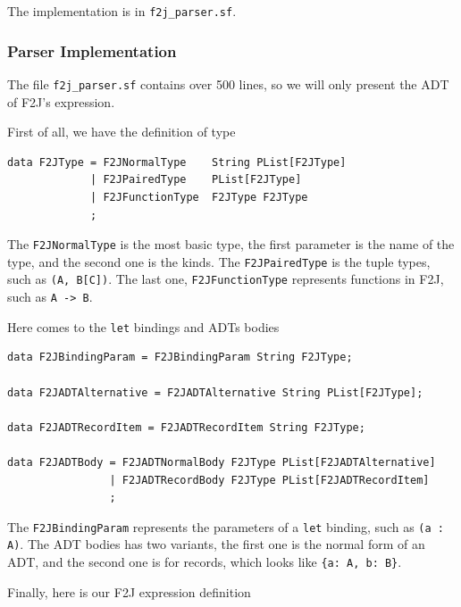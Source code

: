 The implementation is in \texttt{f2j\_parser.sf}.

\subsubsection{Parser Implementation}

The file \texttt{f2j\_parser.sf} contains over 500 lines, so we will only present the ADT of F2J's expression.

First of all, we have the definition of type

\begin{lstlisting}
data F2JType = F2JNormalType    String PList[F2JType]
             | F2JPairedType    PList[F2JType]
             | F2JFunctionType  F2JType F2JType
             ;
\end{lstlisting}

The \texttt{F2JNormalType} is the most basic type, the first parameter is the name of the type, and the second one is the kinds. The \texttt{F2JPairedType} is the tuple types, such as \texttt{(A, B[C])}. The last one, \texttt{F2JFunctionType} represents functions in F2J, such as \texttt{A -> B}.

Here comes to the \texttt{let} bindings and ADTs bodies

\begin{lstlisting}
data F2JBindingParam = F2JBindingParam String F2JType;

data F2JADTAlternative = F2JADTAlternative String PList[F2JType];

data F2JADTRecordItem = F2JADTRecordItem String F2JType;

data F2JADTBody = F2JADTNormalBody F2JType PList[F2JADTAlternative]
                | F2JADTRecordBody F2JType PList[F2JADTRecordItem]
                ;
\end{lstlisting}

The \texttt{F2JBindingParam} represents the parameters of a \texttt{let} binding, such as \texttt{(a : A)}. The ADT bodies has two variants, the first one is the normal form of an ADT, and the second one is for records, which looks like \texttt{\{a: A, b: B\}}.

Finally, here is our F2J expression definition

